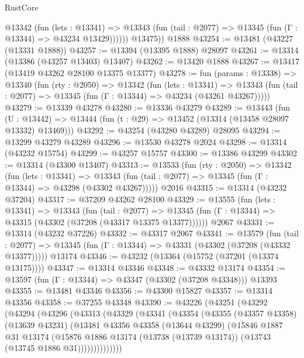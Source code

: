 \begin{lexlean}{RustCore}
\begin{coremodule}
            @13342
              (fun (lets : @13341) =>
              @13343 (fun (tail : @2077) => @13345 (fun (Γ : @13344) => @43234 @13429))))))
        @13475))
    @1888
@43254 := @13481 (@43227 (@13331 @1888))
@43257 := @13394 (@13395 @1888) @28097
@43261 := @13314 (@13386 (@43257 @13403) @13407)
@43262 := @13420 @1888
@43267 := @13417 (@13419 @43262 @28100 @13375 @13377)
@43278 := fun (params : @13338) =>
  @13340
    (fun (rty : @2050) =>
    @13342
      (fun (lets : @13341) =>
      @13343 (fun (tail : @2077) => @13345 (fun (Γ : @13344) => @43234 (@43261 @43267)))))
@43279 := @13339 @43278
@43280 := @13336 @43279
@43289 := @13443
    (fun (U : @13442) => @13444 (fun (t : @29) => @13452 (@13314 (@13458 @28097 @13332) @13469)))
@43292 := @43254 (@43280 @43289) @28095
@43294 := @13299 @43279 @43289
@43296 := @13530 @43278 @2024
@43298 := @13314 (@43232 @15754)
@43299 := @43257 @15757
@43300 := @13386 @43299
@43302 := @13314 (@43300 @13407)
@43313 := @13533
    (fun (rty : @2050) =>
    @13342
      (fun (lets : @13341) =>
      @13343 (fun (tail : @2077) => @13345 (fun (Γ : @13344) => @43298 (@43302 @43267)))))
    @2016
@43315 := @13314 (@43232 @37204)
@43317 := @37209 @43262 @28100
@43329 := @13555
    (fun (lets : @13341) =>
    @13343
      (fun (tail : @2077) =>
      @13345 (fun (Γ : @13344) => @43315 (@43302 (@37208 (@43317 @13375 @13377))))))
    @2067
@43331 := @13314 (@43232 @37226)
@43332 := @43317 @2067
@43341 := @13579
    (fun (tail : @2077) => @13345 (fun (Γ : @13344) => @43331 (@43302 (@37208 (@43332 @13377)))))
    @13174
@43346 := @43232 (@13364 (@15752 (@37201 (@13374 @13175))))
@43347 := @13314 @43346
@43348 := @43332 @13174
@43354 := @13597 (fun (Γ : @13344) => @43347 (@43302 (@37208 @43348))) @13393
@43355 := @13481 @43346
@43356 := @43300 @15827
@43357 := @13314 @43356
@43358 := @37255 @43348
@43390 := @43226
    (@43251
      (@43292
        (@43294
          (@43296
            (@43313
              (@43329
                (@43341
                  (@43354
                    (@43355
                      (@43357 @43358)
                      (@13639 @43231)
                      (@13481
                        @43356
                        @43358
                        (@13644 @43299)
                        (@15846
                          @1887
                          @31
                          @13174
                          (@15876
                            @1886
                            @13174
                            (@13738 (@13739 @13174))
                            (@13743 (@13745 @1886 @31))))))))))))))

\end{coremodule}
\end{lexlean}
